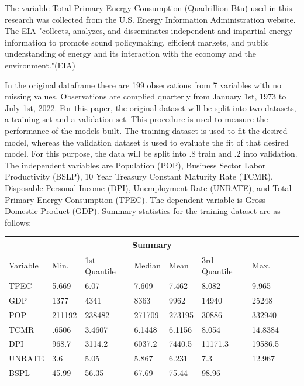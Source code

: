 \documentclass[12pt]{article}
\begin{document}
The variable Total Primary Energy Consumption (Quadrillion Btu) used in this research was collected from the U.S. Energy Information Administration website. 
The EIA "collects, analyzes, and disseminates independent and impartial energy information to promote sound policymaking, efficient markets, and public understanding of energy and its interaction with the economy and the environment."(EIA)


In the original dataframe there are 199 observations from 7 variables with no missing values.
Observations are complied quarterly from January 1st, 1973 to July 1st, 2022.  
For this paper, the original dataset will be split into two datasets, a training set and a validation set. 
This procedure is used to measure the performance of the models built. 
The training dataset is used to fit the desired model, whereas the validation dataset is used to evaluate the fit of that desired model. 
For this purpose, the data will be split into .8 train and .2 into validation.
The independent variables are Population (POP), Business Sector Labor Productivity (BSLP), 10 Year Treasury Constant Maturity Rate (TCMR), Disposable Personal Income (DPI), Unemployment Rate (UNRATE), and Total Primary Energy Consumption (TPEC). 
The dependent variable is Gross Domestic Product (GDP).
Summary statistics for the training dataset are as follows:

\begin{tabular}{ |p{2cm}||p{2cm}|p{2cm}|p{2cm}|p{2cm}|p{2cm}|p{2cm}|p{2cm}|p{2cm}|}
  \hline
  \multicolumn{9}{|c|}{Summary} \\
  \hline
  Variable & Min. & 1st Quantile & Median & Mean & 3rd Quantile & Max. \\
  \hline
  TPEC & 5.669 & 6.07& 7.609 & 7.462 & 8.082 & 9.965\\
  GDP &  1377 & 4341 & 8363 & 9962 & 14940 & 25248\\
  POP & 211192 & 238482 & 271709 & 273195 & 30886 & 332940\\
  TCMR & .6506 & 3.4607 & 6.1448 & 6.1156 & 8.054 & 14.8384\\
  DPI & 968.7 & 3114.2 & 6037.2 & 7440.5 & 11171.3 & 19586.5\\
  UNRATE & 3.6 & 5.05 & 5.867 & 6.231 & 7.3 & 12.967\\
  BSPL & 45.99 & 56.35 & 67.69 & 75.44 & 98.96\\
  \hline
\end{tabular}
\end{document}
